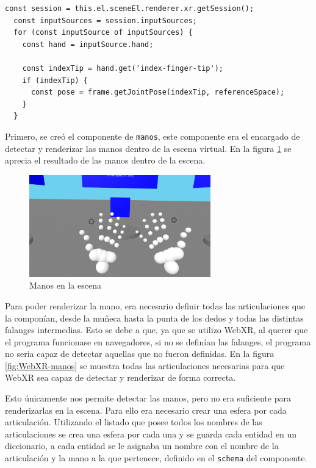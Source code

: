 \documentclass[a4paper, 12pt]{book}
\begin{document}
\begin{lstlisting}[caption=Ejemplo simplificado de acceder a la información XR, captionpos=b, label=lst:defXR]
  const session = this.el.sceneEl.renderer.xr.getSession();
  const inputSources = session.inputSources;
  for (const inputSource of inputSources) {
    const hand = inputSource.hand;
    
    const indexTip = hand.get('index-finger-tip');
    if (indexTip) {
      const pose = frame.getJointPose(indexTip, referenceSpace);
    }
  }
\end{lstlisting}


Primero, se creó el componente de \texttt{manos}, este componente era el encargado de detectar y renderizar las manos dentro de la escena virtual. En la figura \ref{fig:manos} se aprecia el resultado de las manos dentro de la escena.

\begin{figure}[H] 
  \centering
  \includegraphics[width=0.7\textwidth]{img/manos.jpg} 
  \caption{Manos en la escena}
  \label{fig:manos}
\end{figure}

Para poder renderizar la mano, era necesario definir todas las articulaciones que la componían, desde la muñeca hasta la punta de los dedos y todas las distintas falanges intermedias. Esto se debe a que, ya que se utilizo WebXR, al querer que el programa funcionase en navegadores, si no se definían las falanges, el programa no seria capaz de detectar aquellas que no fueron definidas.
En la figura \ref{fig:WebXR-manos} se muestra todas las articulaciones necesarias para que WebXR sea capaz de detectar y renderizar de forma correcta. 

Esto únicamente nos permite detectar las manos, pero no era suficiente para renderizarlas en la escena. Para ello era necesario crear una esfera por cada articulación. Utilizando el listado que posee todos los nombres de las articulaciones se crea una esfera por cada una y se guarda cada entidad en un diccionario, a cada entidad se le asignaba un nombre con el nombre de la articulación y la mano a la que pertenece, definido en el \texttt{schema} del componente.
\end{document}
